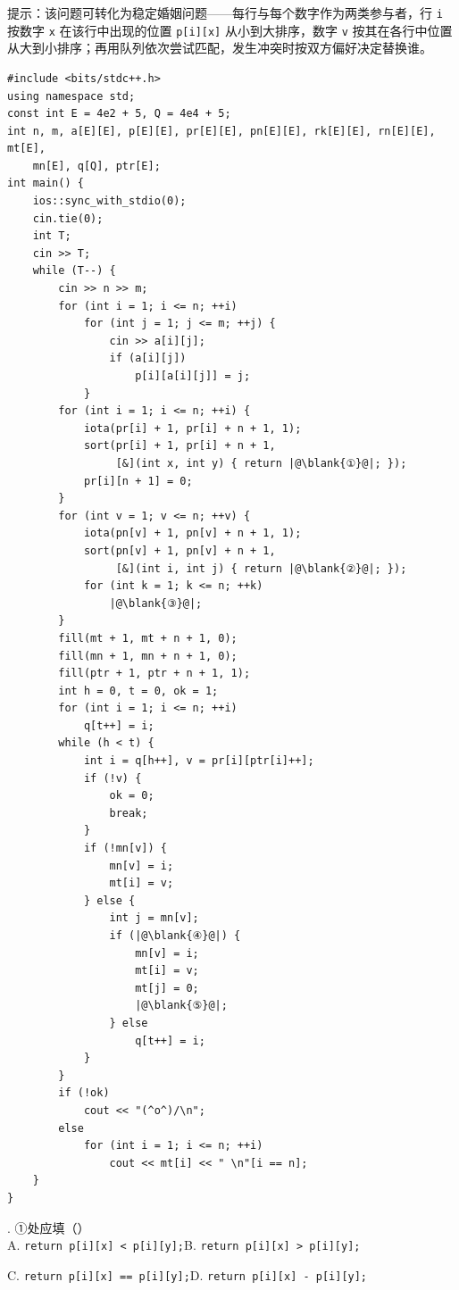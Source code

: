 \documentclass[a4paper]{ctexart}
\newcommand{\blank}[1]{\underline{\makebox[2.1cm][c]{#1}}}
\newcommand{\q}[1]{\noindent #1}
\newcommand{\optw}[2]{\hspace*{2em} #1\hspace*{2em}#2\par}
\begin{document}
提示：该问题可转化为稳定婚姻问题——每行与每个数字作为两类参与者，行 \texttt{i} 按数字 \texttt{x} 在该行中出现的位置 \texttt{p[i][x]} 从小到大排序，数字 \texttt{v} 按其在各行中位置从大到小排序；再用队列依次尝试匹配，发生冲突时按双方偏好决定替换谁。

\begin{codebox}
\begin{lstlisting}
#include <bits/stdc++.h>
using namespace std;
const int E = 4e2 + 5, Q = 4e4 + 5;
int n, m, a[E][E], p[E][E], pr[E][E], pn[E][E], rk[E][E], rn[E][E], mt[E],
    mn[E], q[Q], ptr[E];
int main() {
    ios::sync_with_stdio(0);
    cin.tie(0);
    int T;
    cin >> T;
    while (T--) {
        cin >> n >> m;
        for (int i = 1; i <= n; ++i)
            for (int j = 1; j <= m; ++j) {
                cin >> a[i][j];
                if (a[i][j])
                    p[i][a[i][j]] = j;
            }
        for (int i = 1; i <= n; ++i) {
            iota(pr[i] + 1, pr[i] + n + 1, 1);
            sort(pr[i] + 1, pr[i] + n + 1,
                 [&](int x, int y) { return |@\blank{①}@|; });
            pr[i][n + 1] = 0;
        }
        for (int v = 1; v <= n; ++v) {
            iota(pn[v] + 1, pn[v] + n + 1, 1);
            sort(pn[v] + 1, pn[v] + n + 1,
                 [&](int i, int j) { return |@\blank{②}@|; });
            for (int k = 1; k <= n; ++k)
                |@\blank{③}@|;
        }
        fill(mt + 1, mt + n + 1, 0);
        fill(mn + 1, mn + n + 1, 0);
        fill(ptr + 1, ptr + n + 1, 1);
        int h = 0, t = 0, ok = 1;
        for (int i = 1; i <= n; ++i)
            q[t++] = i;
        while (h < t) {
            int i = q[h++], v = pr[i][ptr[i]++];
            if (!v) {
                ok = 0;
                break;
            }
            if (!mn[v]) {
                mn[v] = i;
                mt[i] = v;
            } else {
                int j = mn[v];
                if (|@\blank{④}@|) {
                    mn[v] = i;
                    mt[i] = v;
                    mt[j] = 0;
                    |@\blank{⑤}@|;
                } else
                    q[t++] = i;
            }
        }
        if (!ok)
            cout << "(^o^)/\n";
        else
            for (int i = 1; i <= n; ++i)
                cout << mt[i] << " \n"[i == n];
    }
}
\end{lstlisting}
\end{codebox}

\q{33.} ①处应填（\qquad）\\
\optw{A. \texttt{return p[i][x] < p[i][y];}}{B. \texttt{return p[i][x] > p[i][y];}}
\optw{C. \texttt{return p[i][x] == p[i][y];}}{D. \texttt{return p[i][x] - p[i][y];}}
\end{document}
